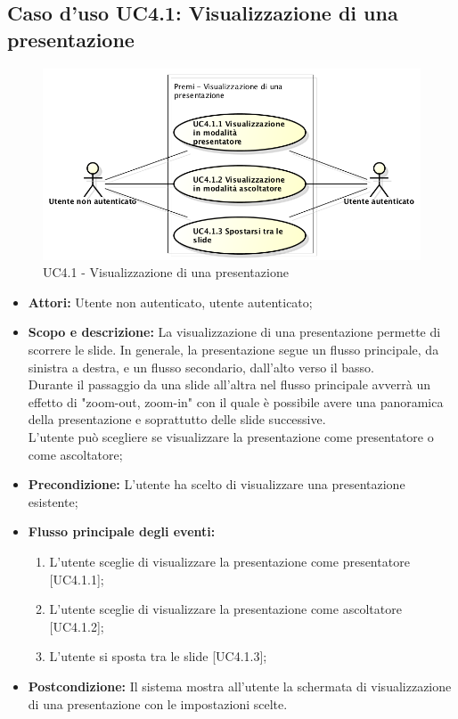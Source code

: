 \subsection{Caso d'uso UC4.1: Visualizzazione di una presentazione}
\begin{figure}[h] 
	\centering 
	\includegraphics[scale=0.45] {img/UC4.1.png}
	\caption{UC4.1 - Visualizzazione di una presentazione} 
\end{figure}

\begin{itemize}
	\item \textbf{Attori:} Utente non autenticato, utente autenticato;
	\item \textbf{Scopo e descrizione:} La visualizzazione di una presentazione permette di scorrere le \gls{slide}. In generale, la presentazione segue un flusso principale, da sinistra a destra, e un flusso secondario, dall'alto verso il basso.\\
	Durante il passaggio da una \gls{slide} all'altra nel flusso principale avverrà un effetto di "zoom-out, zoom-in" con il quale è possibile avere una panoramica della presentazione e soprattutto delle \gls{slide} successive.\\
	L'utente può scegliere se visualizzare la presentazione come presentatore o come ascoltatore;
	\item \textbf{Precondizione:} L'utente ha scelto di visualizzare una presentazione esistente;
	\item \textbf{Flusso principale degli eventi:}
	\begin{enumerate}
		\item L'utente sceglie di visualizzare la presentazione come presentatore [UC4.1.1];
		\item L'utente sceglie di visualizzare la presentazione come ascoltatore [UC4.1.2];
		\item L'utente si sposta tra le \gls{slide} [UC4.1.3];
	\end{enumerate}
	\item \textbf{Postcondizione:} Il sistema mostra all'utente la schermata di visualizzazione di una presentazione con le impostazioni scelte.
\end{itemize}

